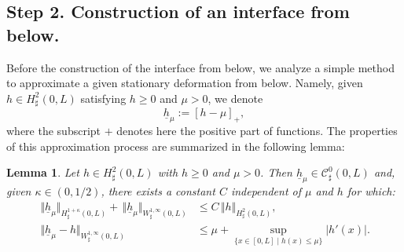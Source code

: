 \documentclass[10pt]{amsart}
\let\mathcal\mathscr
\newtheorem{lemma}[theorem]{Lemma}
\theoremstyle{remark}
\theoremstyle{definition}
\newcommand{\norme}[1]{\,\Vert #1\Vert}
\newcommand{\hb}{{\underline{h}}}
\begin{document}
\subsection{Step 2. Construction of an interface from below.}
Before the construction of the interface from below, we analyze a simple method to approximate a given stationary deformation from below. Namely, given $h \in H^2_{\sharp}(0,L)$ satisfying $h \geq 0$ and $\mu >0$, we denote
\[
\hb_{\mu} := [h-\mu]_{+},
\]
where the subscript $+$ denotes here the positive part of functions. The properties of this approximation process
are summarized in the following lemma:
\begin{lemma}\label{lemma.halpha}
Let $h \in H^{2}_{\sharp}(0,L)$ with $h \geq 0$ and $\mu >0$.
Then $\hb_{\mu}\in \mathcal{C}_\sharp^{0}(0,L)$ and, given $\kappa \in (0,1/2)$, there exists a constant $C$
independent of $\mu$ and $h$ for which:
\begin{align}
\norme{\hb_{\mu}}_{H_\sharp^{1+\kappa}(0,L)} + \norme{\hb_{\mu}}_{W^{1,\infty}_\sharp(0,L)}&\leq C\norme{h}_{H_\sharp^{2}(0,L)}, \label{h1}\\
\norme{\hb_{\mu}-h}_{W_\sharp^{1, \infty}(0,L)}&\leq {\mu}+\sup_{\{x\in[0, L]\mid h(x)\leq \mu\}}\vert h'(x)\vert.\label{h2}
\end{align}
\end{lemma}
\end{document}
